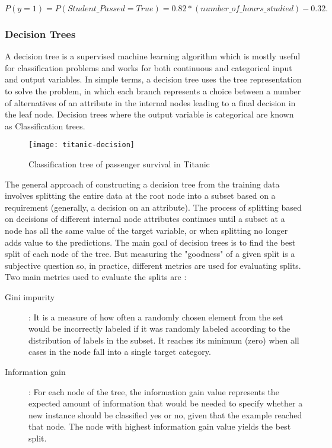 \documentclass[11pt,openright]{report}
\begin{document}
\begin{equation}
 P(y=1) = P(Student\_Passed= True) = 0.82 * (number\_of\_hours\_studied) -0.32.  \label{eq:logisticExample} 
 \end{equation}


\subsubsection {Decision Trees}

A decision tree is a supervised machine learning algorithm which is mostly useful for classification problems and works for both continuous and categorical input and output variables. In simple terms, a decision tree uses the tree representation to solve the problem, in which each branch represents a choice between a number of alternatives of an attribute in the internal nodes leading to a final decision in the leaf node. Decision trees where the output variable is categorical are known as Classification trees.

  \begin{figure}
	\centering
	\texttt{[image: titanic-decision]}
	\caption{Classification tree of passenger survival in Titanic}
	\label{fig:classification_tree_titanic}
\end{figure} 

The general approach of constructing a decision tree from the training data involves splitting the entire data at the root node into a subset based on a requirement (generally, a decision on an attribute). The process of splitting based on decisions of different internal node attributes continues until a subset at a node has all the same value of the target variable, or when splitting no longer adds value to the predictions. The main goal of decision trees is to find the best split of each node of the tree. But measuring the "goodness" of a given split is a subjective question so, in practice, different metrics are used for evaluating splits. Two main metrics used to evaluate the splits are :
\begin{description}
    \item[Gini impurity] : It is a measure of how often a randomly chosen element from the set would be incorrectly labeled if it was randomly labeled according to the distribution of labels in the subset. It reaches its minimum (zero) when all cases in the node fall into a single target category. 

    \item[Information gain] : For each node of the tree, the information gain value represents the expected amount of information that would be needed to specify whether a new instance should be classified yes or no, given that the example reached that node. The node with highest information gain value yields the best split. 
     
 \end{description}
 
\end{document}
